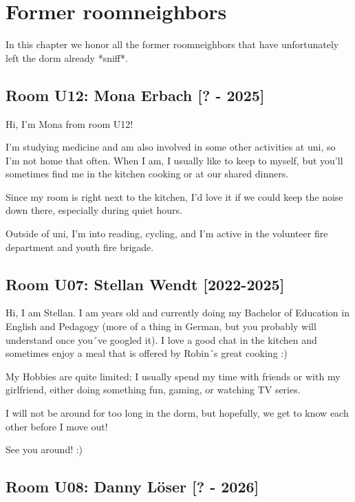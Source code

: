 \chapter{Former roomneighbors} \label{chap:former_roomneighbors}

In this chapter we honor all the former roomneighbors that have unfortunately left the dorm already *sniff*.

\section{Room U12: Mona Erbach [? - 2025]}\label{sec:monaE}
Hi, I’m Mona from room U12!

I’m studying medicine and am also involved in some other activities at uni, so I’m not home that often. When I am, I usually like to keep to myself, but you’ll sometimes find me in the kitchen cooking or at our shared dinners.

Since my room is right next to the kitchen, I’d love it if we could keep the noise down there, especially during quiet hours.

Outside of uni, I’m into reading, cycling, and I’m active in the volunteer fire department and youth fire brigade.

\section{Room U07: Stellan Wendt [2022-2025]} \label{sec:stellanW}
%
\FPsub\result{\theCurrentDate}{\theBirthdate}
\FPdiv{}
\FPtrunc{}

Hi, I am Stellan. I am \myage{} years old and currently doing my Bachelor of Education in English and Pedagogy (more of a thing in German, but you probably will understand once you´ve googled it). I love a good chat in the kitchen and sometimes enjoy a meal that is offered by Robin´s great cooking :)

My Hobbies are quite limited; I usually spend my time with friends or with my girlfriend, either doing something fun, gaming, or watching TV series.

I will not be around for too long in the dorm, but hopefully, we get to know each other before I move out!

See you around! :)

\section{Room U08: Danny Löser [? - 2026]} \label{sec:dannyL}
%
\FPsub\result{\theCurrentDate}{\theBirthdate}
\FPdiv{}
\FPtrunc{}


